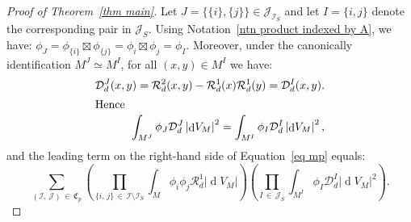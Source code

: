 \documentclass[AHL,Unicode,longabstracts,published]{cedram}
\DeclareMathOperator{\dmesure}{d}
\newcommand{\D}{\mathcal{D}}
\newcommand{\I}{\mathcal{I}}
\newcommand{\J}{\mathcal{J}}
\newcommand{\clR}{\mathcal{R}}
\newcommand{\frkC}{\mathfrak{C}}
\newcommand{\norm}[1]{\left\lvert #1 \right\rvert}
\newcommand{\rmes}[1]{\norm{\dmesure\! V_{#1}}}
\begin{document}
\begin{proof}[{Proof of Theorem~\ref{thm main}}]
Let $J =\{\{i\},\{j\}\} \in \J_{\I_S}$ and let $I = \{i,j\}$ denote the corresponding pair in $\J_S$. Using Notation~\ref{ntn product indexed by A}, we have: $\phi_J = \phi_{\{i\}} \boxtimes \phi_{\{j\}} = \phi_i \boxtimes \phi_j = \phi_I$. Moreover, under the canonically identification $M^J \simeq M^I$, for all $(x,y) \in M^I$ we have:
\begin{align*}
\D_d^J(x,y) = \clR^2_d(x,y) - \clR^1_d(x)\clR^1_d(y) = \D_d^I(x,y).
\\
\intertext{Hence}
\int_{M^J} \phi_J \D_d^J \rmes{M}^2 = \int_{M^I} \phi_I \D_d^I \rmes{M}^2,
\end{align*}
and the leading term on the right-hand side of Equation~\eqref{eq mp} equals:
\begin{equation}\label{eq mp leading term}
\sum_{(\I,\,\J)\,\in\,\frkC_p} \left(\prod_{\{i,\,j\}\,\in\,\I \setminus \I_S} \int_M \phi_i\phi_j\clR^1_d \rmes{M}\right)\left(\prod_{I\,\in\,\J_S} \int_{M^I} \phi_I \D_d^I \rmes{M}^2 \right).
\end{equation}


\end{proof}
\end{document}
